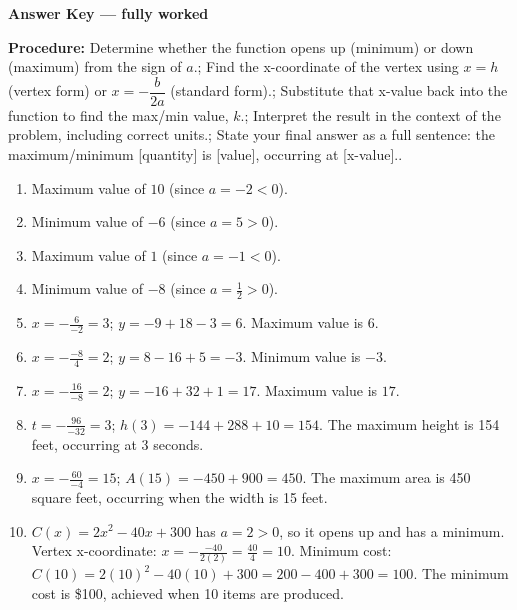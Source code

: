 \documentclass[12pt]{article}
\begin{document}
\begin{center}{\Large \textbf{Answer Key --- fully worked}}\end{center}
\vspace{0.25cm}
\textbf{Procedure:} Determine whether the function opens up (minimum) or down (maximum) from the sign of $a$.; Find the x-coordinate of the vertex using $x=h$ (vertex form) or $x=-\dfrac{b}{2a}$ (standard form).; Substitute that x-value back into the function to find the max/min value, $k$.; Interpret the result in the context of the problem, including correct units.; State your final answer as a full sentence: the maximum/minimum [quantity] is [value], occurring at [x-value]..\\[8pt]
\begin{enumerate}[label=\textbf{\arabic*.},itemsep=7pt]
  \item Maximum value of $10$ (since $a=-2<0$).
  \item Minimum value of $-6$ (since $a=5>0$).
  \item Maximum value of $1$ (since $a=-1<0$).
  \item Minimum value of $-8$ (since $a=\frac{1}{2}>0$).
  \item $x=-\frac{6}{-2}=3$; $y=-9+18-3=6$. Maximum value is $6$.
  \item $x=-\frac{-8}{4}=2$; $y=8-16+5=-3$. Minimum value is $-3$.
  \item $x=-\frac{16}{-8}=2$; $y=-16+32+1=17$. Maximum value is $17$.
  \item $t=-\frac{96}{-32}=3$; $h(3)=-144+288+10=154$. The maximum height is 154 feet, occurring at 3 seconds.
  \item $x=-\frac{60}{-4}=15$; $A(15)=-450+900=450$. The maximum area is 450 square feet, occurring when the width is 15 feet.
  \item $C(x)=2x^2-40x+300$ has $a=2>0$, so it opens up and has a minimum. Vertex x-coordinate: $x=-\frac{-40}{2(2)}=\frac{40}{4}=10$. Minimum cost: $C(10)=2(10)^2-40(10)+300=200-400+300=100$. The minimum cost is \$100, achieved when 10 items are produced.
\end{enumerate}
\end{document}
